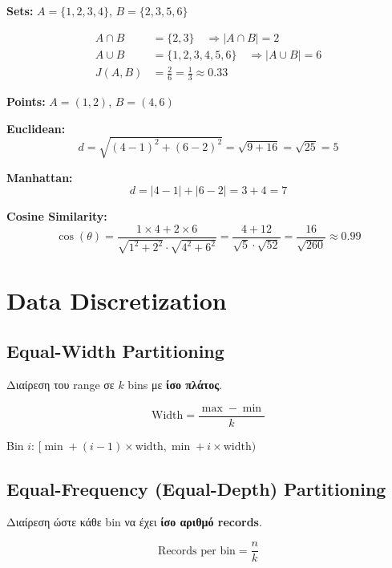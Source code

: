 \begin{examplebox}
\textbf{Sets:} $A = \{1, 2, 3, 4\}$, $B = \{2, 3, 5, 6\}$

\begin{align*}
A \cap B &= \{2, 3\} \quad \Rightarrow |A \cap B| = 2 \\
A \cup B &= \{1, 2, 3, 4, 5, 6\} \quad \Rightarrow |A \cup B| = 6 \\
J(A, B) &= \frac{2}{6} = \frac{1}{3} \approx 0.33
\end{align*}
\end{examplebox}

\begin{examplebox}
\textbf{Points:} $A = (1, 2)$, $B = (4, 6)$

\textbf{Euclidean:}
\[
d = \sqrt{(4-1)^2 + (6-2)^2} = \sqrt{9 + 16} = \sqrt{25} = 5
\]

\textbf{Manhattan:}
\[
d = |4-1| + |6-2| = 3 + 4 = 7
\]

\textbf{Cosine Similarity:}
\[
\cos(\theta) = \frac{1 \times 4 + 2 \times 6}{\sqrt{1^2+2^2} \cdot \sqrt{4^2+6^2}} = \frac{4 + 12}{\sqrt{5} \cdot \sqrt{52}} = \frac{16}{\sqrt{260}} \approx 0.99
\]
\end{examplebox}

\section{Data Discretization}

\subsection{Equal-Width Partitioning}

\begin{formulabox}
Διαίρεση του range σε $k$ bins με \textbf{ίσο πλάτος}.

\[
\text{Width} = \frac{\max - \min}{k}
\]

Bin $i$: $[\min + (i-1) \times \text{width}, \min + i \times \text{width})$
\end{formulabox}

\subsection{Equal-Frequency (Equal-Depth) Partitioning}

\begin{formulabox}
Διαίρεση ώστε κάθε bin να έχει \textbf{ίσο αριθμό records}.

\[
\text{Records per bin} = \frac{n}{k}
\]
\end{formulabox}

